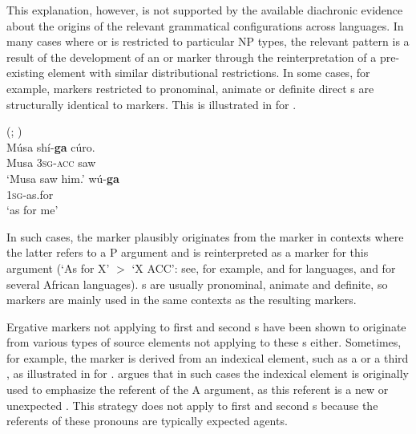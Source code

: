 \documentclass[output=paper]{langsci/langscibook}
\begin{document}
This explanation, however, is not  supported by the available
diachronic evidence about the origins of the relevant grammatical configurations across languages. In many cases where  or   is restricted to
particular NP types, the relevant  pattern is a result of the development of an  or  marker through the reinterpretation of a pre-existing element with similar distributional restrictions.  In some cases, for example,  markers restricted
to pronominal, animate or  definite direct s are structurally identical to  markers. This is illustrated  in  for . 


\ea\label{kanuri}
 (; )\\
\ea
  \gll Músa sh{í}-\textbf{{ga}} cúro.\\
  Musa 3\textsc{sg-acc} saw\\
  \glt `Musa saw him.' 
  \ex
  \gll wú-\textbf{{ga}}\\
  1\textsc{sg}-as.for\\
  \glt `as for me' 

\z
\z

\noindent In such cases, the  marker plausibly originates from the  marker in contexts where the latter refers to a P argument and is reinterpreted as a marker for this argument (`As for X' $>$ `X ACC': see, for example, \citealt{Rohlfs1984} and \citealt{Pensado1995} for  languages, and \citealt{Konig2008} for several African languages). s are usually pronominal, animate and definite, so  markers are mainly used in the same contexts as the resulting  markers. 

Ergative 
\label{p:cristofaro:ergatives}
markers not applying to first and second 
s have been shown to originate
from various types of source elements not applying to these s
either. Sometimes, for example,  the  marker is derived from an indexical
element, such as a  or a third  , as
illustrated in  for .
\citet{McGregor2006,McGregor2008} argues that in such cases the indexical
element is
originally used to emphasize the referent of the A argument, as this
referent is a new or unexpected . This strategy does not
    apply to  first and second  s because the referents
    of these pronouns are typically expected agents.
\end{document}
